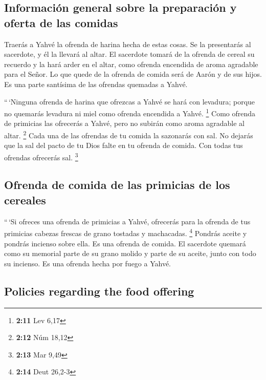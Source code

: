 \begin{paracol}{2}
\hypertarget{informaciuxf3n-general-sobre-la-preparaciuxf3n-y-oferta-de-las-comidas}{%
\subsection{Información general sobre la preparación y oferta de las
comidas}\label{informaciuxf3n-general-sobre-la-preparaciuxf3n-y-oferta-de-las-comidas}}

 Traerás a Yahvé la ofrenda de harina hecha de estas
cosas. Se la presentarás al sacerdote, y él la llevará al altar.
 El sacerdote tomará de la ofrenda de cereal su recuerdo y
la hará arder en el altar, como ofrenda encendida de aroma agradable
para el Señor.  Lo que quede de la ofrenda de comida será
de Aarón y de sus hijos. Es una parte santísima de las ofrendas quemadas
a Yahvé.

 ``\,`Ninguna ofrenda de harina que ofrezcas a Yahvé se
hará con levadura; porque no quemarás levadura ni miel como ofrenda
encendida a Yahvé. \footnote{\textbf{2:11} Lev 6,17} 
Como ofrenda de primicias las ofrecerás a Yahvé, pero no subirán como
aroma agradable al altar. \footnote{\textbf{2:12} Núm 18,12}
 Cada una de las ofrendas de tu comida la sazonarás con
sal. No dejarás que la sal del pacto de tu Dios falte en tu ofrenda de
comida. Con todas tus ofrendas ofrecerás sal. \footnote{\textbf{2:13}
  Mar 9,49}

\hypertarget{ofrenda-de-comida-de-las-primicias-de-los-cereales}{%
\subsection{Ofrenda de comida de las primicias de los
cereales}\label{ofrenda-de-comida-de-las-primicias-de-los-cereales}}

 ``\,`Si ofreces una ofrenda de primicias a Yahvé,
ofrecerás para la ofrenda de tus primicias cabezas frescas de grano
tostadas y machacadas. \footnote{\textbf{2:14} Deut 26,2-3}
 Pondrás aceite y pondrás incienso sobre ella. Es una
ofrenda de comida.  El sacerdote quemará como su memorial
parte de su grano molido y parte de su aceite, junto con todo su
incienso. Es una ofrenda hecha por fuego a Yahvé.

\switchcolumn
\begin{otherlanguage}{english}

\hypertarget{policies-regarding-the-food-offering}{%
\subsection{Policies regarding the food
offering}\label{policies-regarding-the-food-offering}}


\end{otherlanguage}
\end{paracol}
